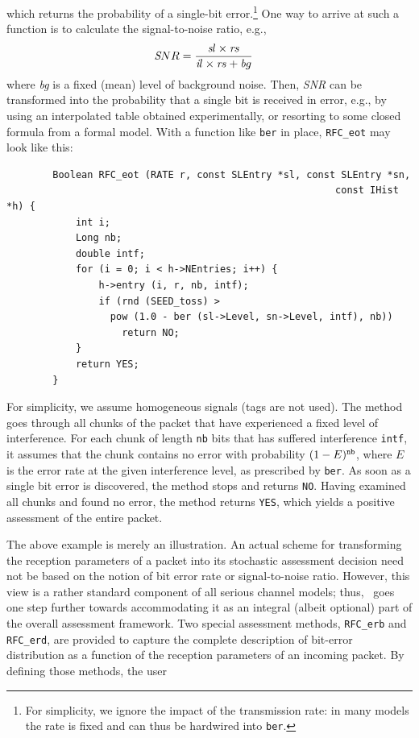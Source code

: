 \noindent
which returns the probability of a single-bit error.\footnote{For simplicity,
we ignore the impact of the transmission rate: in many models
the rate is fixed and can thus be hardwired into {\tt ber}.}
One way to arrive at such a function is to calculate the signal-to-noise
ratio, e.g.,
\[
{\textit SNR} = \frac{{\textit sl} \times {\textit rs}}{{\textit il} \times {\textit rs} + {\textit bg}}\;\;\;\,
\]
where {\em bg\/} is a fixed (mean) level of background noise.
Then, {\em SNR\/} can be transformed into
the probability that a single bit is received in error, e.g., by using an
interpolated table obtained experimentally, or resorting to some closed
formula from a formal model.
With a function like {\tt ber} in place, {\tt RFC\_eot} may look like this:

\begin{verbatim}
        Boolean RFC_eot (RATE r, const SLEntry *sl, const SLEntry *sn,
                                                         const IHist *h) {
            int i;
            Long nb;
            double intf;
            for (i = 0; i < h->NEntries; i++) {
                h->entry (i, r, nb, intf);
                if (rnd (SEED_toss) >
                  pow (1.0 - ber (sl->Level, sn->Level, intf), nb))
                    return NO;
            }
            return YES;
        }
\end{verbatim}

\noindent
For simplicity, we assume homogeneous signals (tags are not used).
The method goes through all chunks of the packet that have experienced a fixed
level of interference.
For each chunk of length {\tt nb} bits that has suffered interference
{\tt intf}, it assumes that the chunk contains no error with probability
$(1-E)^{\tt nb}$, where $E$ is the error rate at the given interference level,
as prescribed by {\tt ber}.
As soon as a single bit error is discovered, the method stops and returns
{\tt NO}.
Having examined all chunks and found no error, the method returns {\tt YES},
which yields a positive assessment of the entire packet.

\medskip

The above example is merely an illustration.
An actual scheme for transforming the reception parameters of a packet
into its stochastic assessment decision need not be based on the notion
of bit error rate or signal-to-noise ratio.
However, this view is a rather standard component of all serious channel
models; thus, \smurph\ goes one step further towards accommodating it
as an integral (albeit optional) part of the overall assessment framework.
Two special assessment methods, {\tt RFC\_erb} and {\tt RFC\_erd}, are
provided to capture the complete description of bit-error distribution as
a function of the reception parameters of an incoming packet.
By defining those methods, the user

